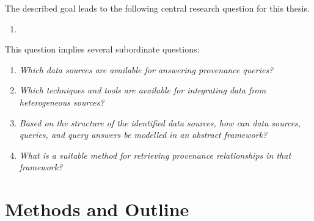 The described goal leads to the following
central research question for this thesis.
%
\begin{mdframed}[
  linewidth=1pt,
  linecolor=black!50,
  innerleftmargin=0pt,innerrightmargin=0pt,
  leftline=false,rightline=false
]
  \begin{enumerate}
    \item[\RQ\phantom{\mybold{1}}]
  \end{enumerate}
\end{mdframed}
%
This question implies several subordinate questions:
%
\begin{mdframed}[
  linewidth=1pt,
  linecolor=black!50,
  innerleftmargin=0pt,innerrightmargin=0pt,
  leftline=false,rightline=false
]
  \begin{enumerate}
    \item[\subquestion{1}]
      \emph{Which data sources are available for answering provenance queries?}
    \item[\subquestion{2}]
      \emph{Which techniques and tools are available for integrating
      data from heterogeneous sources?}
    \item[\subquestion{3}]
      \emph{Based on the structure of the identified data sources,
      how can data sources, queries, and query answers be modelled in an abstract framework?}
    \item[\subquestion{4}]
      \emph{What is a suitable method for retrieving provenance relationships
      in that framework?}
  \end{enumerate}
\end{mdframed}


\section{Methods and Outline}
\label{sec:methods}


